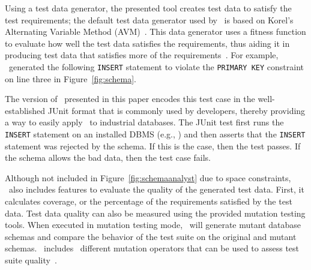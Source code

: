 Using a test data generator, the presented tool creates test data to satisfy the test requirements; the default test
data generator used by \sa~is based on Korel's Alternating Variable Method (AVM)~\cite{Korel:AVM}. This data generator
uses a fitness function to evaluate how well the test data satisfies the requirements, thus aiding it in producing test
data that satisfies more of the requirements~\cite{mcminn2015effectiveness}. For example, \sa~generated the following
\texttt{INSERT} statement to violate the \texttt{PRIMARY KEY} constraint on line three in Figure~\ref{fig:schema}.


\vspace{1ex}

\noindent {}

\vspace{1ex}


The version of \sa~presented in this paper encodes this test case in the well-established JUnit format that is commonly
used by developers, thereby providing a way to easily apply \sa~to industrial databases. The JUnit test first runs the
\texttt{INSERT} statement on an installed DBMS (e.g., \sqlite) and then asserts that the \texttt{INSERT} statement was
rejected by the schema. If this is the case, then the test passes. If the schema allows the bad data, then the test
case fails.




Although not included in Figure~\ref{fig:schemaanalyst} due to space constraints, \sa~also includes features to evaluate
the quality of the generated test data. First, it calculates coverage, or the percentage of the requirements satisfied
by the test data. Test data quality can also be measured using the provided mutation testing tools. When executed in
mutation testing mode, \sa~will generate mutant database schemas and compare the behavior of the test suite on the
original and mutant schemas. \sa~includes \nummutationoperators~different mutation operators that can be used to assess
test suite quality~\cite{wright2015mutation}.



